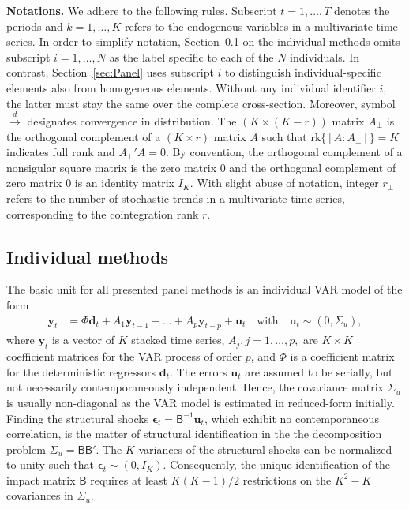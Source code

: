 \textbf{Notations.} We adhere to the following rules. Subscript $ t = 1, \ldots, T $ denotes the periods and $ k = 1, \ldots, K $ refers to the endogenous variables in a multivariate time series. In order to simplify notation, Section~\ref{sec:Indiv} on the individual methods omits subscript $ i = 1, \ldots, N $ as the label specific to each of the $ N $ individuals. In contrast, Section~\ref{sec:Panel} uses subscript $ i $ to distinguish individual-specific elements also from homogeneous elements. Without any individual identifier $ i $, the latter must stay the same over the complete cross-section. Moreover, symbol $ \overset{d}{\longrightarrow} $ designates convergence in distribution. The $ (K \times (K-r)) $ matrix $ A_\perp $ is the orthogonal complement of a $ (K \times r) $ matrix $ A $ such that $ \text{rk} \lbrace [A : A_\perp] \rbrace = K $ indicates full rank and $ A_\perp'A=0 $. By convention, the orthogonal complement of a nonsigular square matrix is the zero matrix $ 0 $ and the orthogonal complement of zero matrix $ 0 $ is an identity matrix $ I_K $. With slight abuse of notation, integer $ r_\perp $ refers to the number of stochastic trends in a multivariate time series, corresponding to the cointegration rank $ r $.


\subsection{Individual methods} \label{sec:Indiv}
The basic unit for all presented panel methods is an individual VAR model of the form 
\begin{align} \label{eq:VAR}
	\boldsymbol{y}_{t} &= \Phi \boldsymbol{d}_{t} + A_1 \boldsymbol{y}_{t-1} + ... + A_p \boldsymbol{y}_{t-p} + \boldsymbol{u}_{t} \quad \textrm{with} \quad \boldsymbol{u}_{t} \sim (0,\Sigma_u) ,
\end{align}
where $\boldsymbol{y}_{t}$ is a vector of $ K $ stacked time series, $A_j, j=1,\ldots,p,$ are $ K \times K $ coefficient matrices for the VAR process of order $p$, and $ \Phi $ is a coefficient matrix for the deterministic regressors $ \boldsymbol{d}_{t} $. The errors $ \boldsymbol{u}_{t} $ are assumed to be serially, but not necessarily contemporaneously independent. Hence, the covariance matrix $ \Sigma_u $ is usually non-diagonal as the VAR model is estimated in reduced-form initially. Finding the structural shocks $ \boldsymbol{\epsilon}_{t} = \mathsf{B}^{-1} \boldsymbol{u}_{t} $, which exhibit no contemporaneous correlation, is the matter of structural identification in the the decomposition problem $ \Sigma_u = \mathsf{B} \mathsf{B}' $. The $ K $ variances of the structural shocks can be normalized to unity such that $ \boldsymbol{\epsilon}_{t} \sim ( 0, I_K ) $. Consequently, the unique identification of the impact matrix $ \mathsf{B}$ requires at least $ K(K-1)/2 $ restrictions on the $ K^2-K $ covariances in $ \Sigma_u $.

